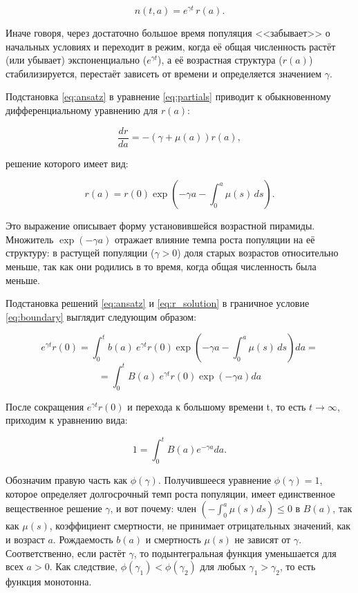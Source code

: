 \documentclass[a4paper, 14pt]{extarticle}
\begin{document}
\begin{equation}
n(t, a) = e^{\gamma t} \, r(a).
\label{eq:ansatz}
\end{equation}

Иначе говоря, через достаточно большое время популяция <<забывает>> о начальных условиях и переходит в режим, когда её общая численность растёт (или убывает) экспоненциально (\( e^{\gamma t} \)), а её возрастная структура (\( r(a) \)) стабилизируется, перестаёт зависеть от времени и определяется значением $\gamma$.

Подстановка \eqref{eq:ansatz} в уравнение \eqref{eq:partials} приводит к обыкновенному дифференциальному уравнению для \( r(a) \):

\[
\frac{dr}{da} = -(\gamma + \mu(a)) r(a),
\]

решение которого имеет вид:

\begin{equation}
r(a) = r(0) \exp\left( -\gamma a - \int_0^a \mu(s) \, ds \right).
\label{eq:r_solution}
\end{equation}

Это выражение описывает форму установившейся возрастной пирамиды. Множитель \( \exp(-\gamma a) \) отражает влияние темпа роста популяции на её структуру: в растущей популяции (\( \gamma > 0 \)) доля старых возрастов относительно меньше, так как они родились в то время, когда общая численность была меньше.

Подстановка решений \eqref{eq:ansatz} и \eqref{eq:r_solution} в граничное условие \eqref{eq:boundary} выглядит следующим образом:

\[
e^{\gamma t} r(0) = \int_{0}^{t} b(a)\ e^{\gamma t} r(0) \exp\left( -\gamma a -\int_{0}^{a} \mu(s) \, ds \right) da =
\]
\[
= \int_{0}^{t} B(a)\ e^{\gamma t} r(0) \exp\left( -\gamma a\right) da
\]

После сокращения $e^{\gamma t} r(0)$ и перехода к большому времени t, то есть $t \to \infty$, приходим к уравнению вида:

\begin{equation}
1 =  \int_{0}^{t} B(a) e^{-\gamma a} da.
\label{eq:phi_gamma}
\end{equation}

Обозначим правую часть как $\phi(\gamma)$. Получившееся уравнение $\phi(\gamma) = 1$, которое определяет долгосрочный темп роста популяции, имеет единственное вещественное решение $\gamma$, и вот почему: член $\left( -\int_0^a \mu(s) ds \right) \le 0$ в $B(a)$, так как $\mu(s)$, коэффициент смертности, не принимает отрицательных значений, как и возраст $a$. Рождаемость $b(a)$ и смертность $\mu(s)$ не зависят от $\gamma$. Соответственно, если растёт $\gamma$, то подынтегральная функция уменьшается для всех $a > 0$. Как следствие, $\phi(\gamma_1) < \phi(\gamma_2)$ для любых $\gamma_1 > \gamma_2$, то есть функция монотонна.
\end{document}
